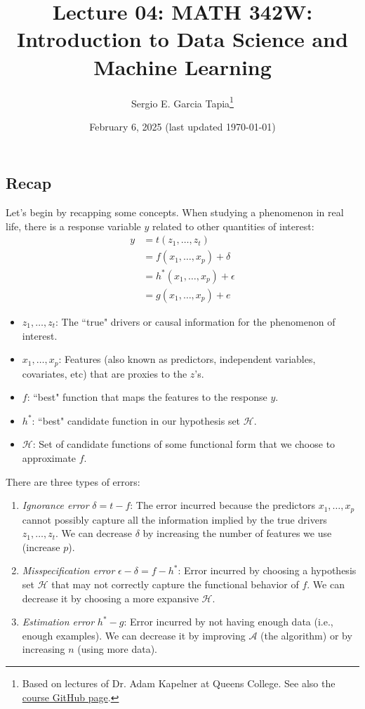 \documentclass[12pt, a4paper]{article}
\title{Lecture 04: MATH 342W: Introduction to Data Science and Machine Learning}
\author{Sergio E. Garcia Tapia\thanks{Based on lectures of Dr. Adam Kapelner at Queens College.
		See also the \href{https://github.com/kapelner/QC_MATH_342W_Spring_2025}{course GitHub page}.}}
\date{February 6, 2025 (last updated \today)}
\theoremstyle{definition}
\begin{document}
	\maketitle
	
	\subsection*{Recap}
	Let's begin by recapping some concepts. When studying a phenomenon in real life,
	there is a response variable $y$ related to other quantities of interest:
	\begin{align*}
		y &= t(z_1,\ldots,z_t)\\
		&= f(x_1,\ldots,x_p) + \delta\\
		&=h^*(x_1,\ldots,x_p) + \epsilon\\
		&=g(x_1,\ldots,x_p) + e
	\end{align*}
	\begin{itemize}
		\item $z_1,\ldots,z_t$: The ``true" drivers or causal information for the phenomenon of interest.
		\item $x_1,\ldots,x_p$: Features (also known as predictors, independent variables,
		covariates, etc) that are proxies to the $z$'s.
		\item $f$: ``best" function that maps the features to the response $y$.
		\item $h^*$: ``best" candidate function in our hypothesis set $\mathcal{H}$.
		\item $\mathcal{H}$: Set of candidate functions of some functional form that we choose to
		approximate $f$.
	\end{itemize}
	
	There are three types of errors:
	\begin{enumerate}[label=(\roman*)]
		\item \emph{Ignorance error} $\delta = t - f$: The error incurred because the predictors
		$x_1,\ldots,x_p$ cannot possibly capture all the information implied by the
		true drivers $z_1,\ldots,z_t$. We can decrease $\delta$ by increasing the
		number of features we use (increase $p$).
		\item \emph{Misspecification error} $\epsilon-\delta=f-h^*$: Error incurred by choosing
		a hypothesis set $\mathcal{H}$ that may not correctly capture the functional behavior of $f$.
		We can decrease it by choosing a more expansive $\mathcal{H}$.
		\item \emph{Estimation error} $h^*-g$: Error incurred by not having enough data
		(i.e., enough examples). We can decrease it by improving $\mathcal{A}$ (the algorithm)
		or by increasing $n$ (using more data).
	\end{enumerate}
\end{document}
